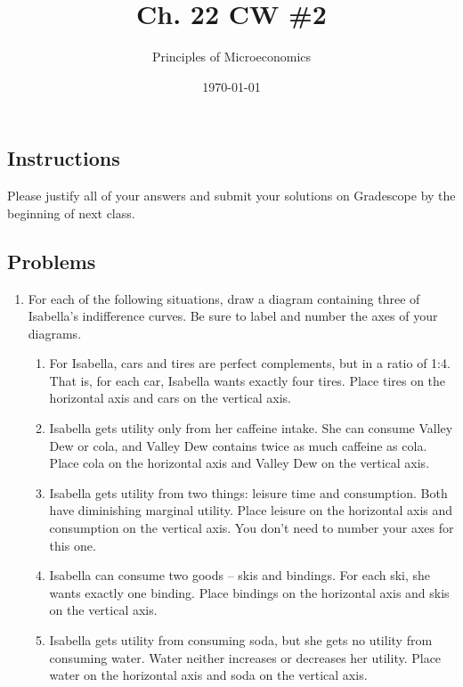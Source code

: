\documentclass{article}
\title{Ch. 22 CW \#2}
\author{Principles of Microeconomics}
\date{\today}
\begin{document}
\maketitle

\subsection*{Instructions} Please justify all of your answers and submit your solutions on Gradescope by
the beginning of next class.

\subsection*{Problems}

\begin{enumerate}

\item For each of the following situations, draw a diagram containing three of Isabella's indifference curves. Be sure to label and number the axes of your diagrams.

	\begin{enumerate}
	
	\item For Isabella, cars and tires are perfect complements, but in a ratio of 1:4. That is, for each car, Isabella wants exactly four tires. Place tires on the horizontal axis and cars on the vertical axis.
	
	\item Isabella gets utility only from her caffeine intake. She can consume Valley Dew or cola, and Valley Dew contains twice as much caffeine as cola. Place cola on the horizontal axis and Valley Dew on the vertical axis.
	
	\item Isabella gets utility from two things: leisure time and consumption. Both have diminishing marginal utility. Place leisure on the horizontal axis and consumption on the vertical axis. You don't need to number your axes for this one.
	
	\item Isabella can consume two goods -- skis and bindings. For each ski, she wants exactly one binding. Place bindings on the horizontal axis and skis on the vertical axis.
	
	\item Isabella gets utility from consuming soda, but she gets no utility from consuming water. Water neither increases or decreases her utility. Place water on the horizontal axis and soda on the vertical axis.
	

\end{enumerate}
\end{enumerate}
\end{document}
